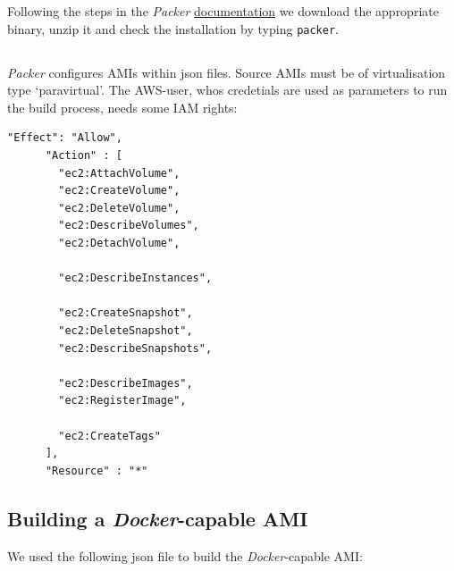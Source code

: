 \documentclass[captions=tableheading]{article}
\begin{document}
Following the steps in the \emph{Packer}  \href{http://www.packer.io/intro/getting-started/setup.html}{documentation} we download the appropriate binary, unzip it and check the installation by typing \texttt{packer}.
\subsection{}

\emph{Packer} configures AMIs within json files. Source AMIs must be of virtualisation type `paravirtual'.  The AWS-user, whos credetials are used as parameters to run the build process, needs some IAM rights:

\begin{verbatim}
"Effect": "Allow",
      "Action" : [
        "ec2:AttachVolume",
        "ec2:CreateVolume",
        "ec2:DeleteVolume",
        "ec2:DescribeVolumes",
        "ec2:DetachVolume",

        "ec2:DescribeInstances",

        "ec2:CreateSnapshot",
        "ec2:DeleteSnapshot",
        "ec2:DescribeSnapshots",

        "ec2:DescribeImages",
        "ec2:RegisterImage",

        "ec2:CreateTags"
      ],
      "Resource" : "*"
\end{verbatim}
\subsection{Building a \emph{Docker}-capable AMI}
\label{sec-7-3}

We used the following json file to build the \emph{Docker}-capable AMI:
\end{document}
